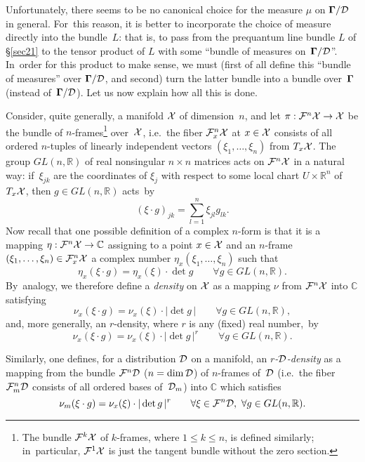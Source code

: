 \documentclass[12pt]{amsart}
\numberwithin{equation}{section}
\theoremstyle{remark}
\newcommand\Omg{{\bigam}}   %
\newcommand\FF{\Cal F}
\newcommand\DD{{\Cal D}}
\newcommand\MD{{\Omg/\DD}}
\newcommand\RR{\mathbb R}
\newcommand{\CC}{\C}
\newcommand{\bigam}{\mbox{\boldmath $\Gamma$}}
\newcommand{\C}{\mathbb C}
\begin{document}
Unfortunately, there seems to be no canonical choice for the measure $\mu$ on
$\MD$ in general. For~this reason, it is better to incorporate the choice of
measure directly into the bundle~$L$: that is, to pass from the prequantum line
bundle $L$ of \S\ref{sec21} to the tensor product of $L$  with some ``bundle of
measures on~$\MD$''. In~order for this product to make sense, we must (first
of all define this ``bundle of measures'' over $\MD$, and second) turn the
latter bundle into a bundle over~$\Omg$ (instead of~$\MD$). Let us now explain
how all this is done.

Consider, quite generally, a manifold ${\mathcal X}$ of dimension~$n$, and let
$\pi:\FF^n\xX\to\xX$ be the bundle of $n$-frames\footnote{The bundle $\FF^k\xX$
of $k$-frames, where $1\le k\le n$, is defined similarly; in~particular,
$\FF^1\xX$ is just the tangent bundle without the zero section.} over~${\mathcal X}$,
i.e.~the fiber $\FF^n_x\xX$ at $x\in{\mathcal X}$ consists of all ordered $n$-tuples of
linearly independent vectors $(\xi_1,\dots,\xi_n)$ from $T_x{\mathcal X}$. The group
$GL(n,\RR)$ of real nonsingular $n\times n$ matrices acts on $\FF^n\xX$ in a
natural way: if~$\xi_{jk}$ are the coordinates of $\xi_j$ with respect to some
local chart $U\times\RR^n$ of $T_x{\mathcal X}$, then $g\in GL(n,\RR)$ acts~by
$$ (\xi\cdot g)_{jk} = \sum_{l=1}^n \xi_{jl} g_{lk}.  $$
Now recall that one possible definition of a complex $n$-form is that it is a
mapping $\eta:\FF^n\xX\to\CC$ assigning to a point $x\in{\mathcal X}$ and an $n$-frame
$(\xi_1,\dots,\xi_n)\in\FF^n_x\xX$ a complex number $\eta_x(\xi_1,\dots,\xi_n)$
such that
$$ \eta_x(\xi\cdot g) = \eta_x(\xi)\cdot\det g \qquad\forall g\in GL(n,\RR). $$
By~analogy, we therefore define a {\it density\/} on ${\mathcal X}$ as a mapping $\nu$
from $\FF^n\xX$ into $\CC$ satisfying
$$ \nu_x(\xi\cdot g)=\nu_x(\xi)\cdot|\det g\,| \qquad\forall g\in GL(n,\RR), $$
and, more generally, an $r$-density, where $r$ is any (fixed) real number,~by
\begin{equation}  \nu_x(\xi\cdot g) = \nu_x(\xi)\cdot|\det g\,|^r
\qquad \forall g\in GL(n,\RR).    \label{tag:HDA}  \end{equation}

Similarly, one defines, for a distribution $\DD$ on a manifold, an {\sl
$r$-$\DD$-density\/} as a mapping from the bundle $\FF^n\DD$ ($n=\dim\DD$) of
$n$-frames of~$\DD$ (i.e.~the fiber $\FF^n_m\DD$ consists of all ordered bases
of~$\DD_m$) into $\CC$ which satisfies
\begin{equation}  \nu_m(\xi\cdot g)=\nu_x(\xi)\cdot|\det g\,|^r
\qquad\forall\xi\in\FF^n\DD, \ \forall g\in GL(n,\RR).  \label{tag:HDB}
\end{equation}
\end{document}
